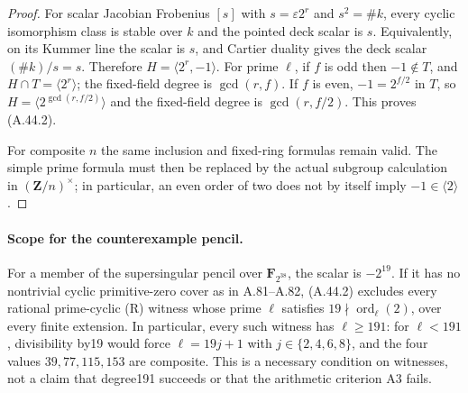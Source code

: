 \documentclass[11pt]{article}
\begin{document}
\begin{proof}
For scalar Jacobian Frobenius $[s]$ with
$s=\varepsilon2^r$ and $s^2=\#k$, every cyclic
isomorphism class is stable over $k$ and the pointed
deck scalar is $s$. Equivalently, on its Kummer line
the scalar is $s$, and Cartier duality gives the
deck scalar $(\#k)/s=s$. Therefore
$H=\langle2^r,-1\rangle$. For prime $\ell$, if
$f$ is odd then $-1\notin T$, and
$H\cap T=\langle2^r\rangle$; the fixed-field degree
is $\gcd(r,f)$. If $f$ is even, $-1=2^{f/2}$ in
$T$, so $H=\langle2^{\gcd(r,f/2)}\rangle$ and
the fixed-field degree is $\gcd(r,f/2)$. This proves
(A.44.2).

For composite $n$ the same inclusion and fixed-ring
formulas remain valid. The simple prime formula
must then be replaced by the actual subgroup
calculation in $(\mathbf Z/n)^\times$; in particular,
an even order of two does not by itself imply
$-1\in\langle2\rangle$.
\end{proof}

\paragraph{Scope for the counterexample pencil.}
For a member of the supersingular pencil over
$\mathbf F_{2^{38}}$, the scalar is $-2^{19}$.
If it has no nontrivial cyclic primitive-zero cover
as in A.81--A.82, (A.44.2) excludes every rational
prime-cyclic \textup{(R)} witness whose prime $\ell$
satisfies $19\nmid\operatorname{ord}_\ell(2)$,
over every finite extension. In particular, every
such witness has $\ell\ge191$: for $\ell<191$,
divisibility by19 would force $\ell=19j+1$ with
$j\in\{2,4,6,8\}$, and the four values
$39,77,115,153$ are composite. This is a necessary
condition on witnesses, not a claim that degree191
succeeds or that the arithmetic criterion A3 fails.
\end{document}
